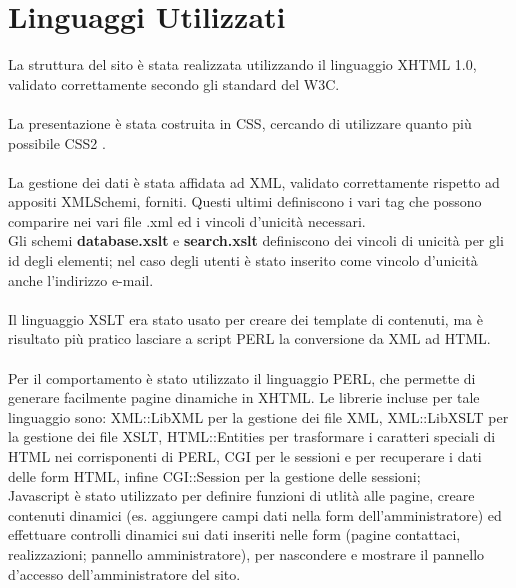 \section{Linguaggi Utilizzati}{
	La struttura del sito è stata realizzata utilizzando il linguaggio XHTML 1.0, validato correttamente secondo gli standard del W3C. \\
	\\
	La presentazione è stata costruita in CSS, cercando di utilizzare quanto più possibile CSS2  %
	.\\
	\\
	La gestione dei dati è stata affidata ad XML, validato correttamente rispetto ad appositi XMLSchemi, forniti. Questi ultimi definiscono i vari tag che possono comparire nei vari file .xml ed i vincoli d'unicità necessari.\\
	Gli schemi \textbf{database.xslt} e \textbf{search.xslt} definiscono dei vincoli di unicità per gli id degli elementi; nel caso degli utenti è stato inserito come vincolo d'unicità anche l'indirizzo e-mail.\\
	\\
	Il linguaggio XSLT era stato usato per creare dei template di contenuti, ma è risultato più pratico lasciare a script PERL la conversione da XML ad HTML.\\
	\\
	Per il comportamento è stato utilizzato il linguaggio PERL, che permette di generare facilmente pagine dinamiche in XHTML. Le librerie incluse per tale linguaggio sono: XML::LibXML per la gestione dei file XML, XML::LibXSLT per la gestione dei file XSLT, HTML::Entities per trasformare i caratteri speciali di HTML nei corrisponenti di PERL, CGI per le sessioni e per recuperare i dati delle form HTML, infine CGI::Session per la gestione delle sessioni;
	\\
	Javascript è stato utilizzato per definire funzioni di utlità alle pagine, creare contenuti dinamici (es. aggiungere campi dati nella form dell'amministratore) ed effettuare controlli dinamici sui dati inseriti nelle form (pagine contattaci, realizzazioni; pannello amministratore),  per nascondere e mostrare il pannello d'accesso dell'amministratore del sito.
}